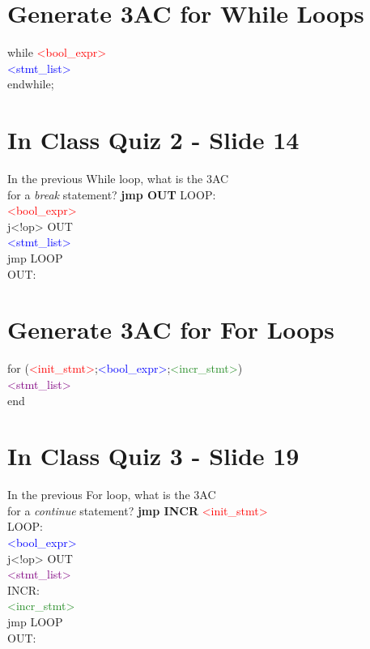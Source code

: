\documentclass{report}
\newcommand{\textb}[1]{\textcolor{blue}{#1}}
\newcommand{\textg}[1]{\textcolor{ForestGreen}{#1}}
\newcommand{\textp}[1]{\textcolor{purple}{#1}}
\newcommand{\textr}[1]{\textcolor{red}{#1}}
\newlength\tindent
\renewcommand{\indent}{\hspace*{\tindent}}
\begin{document}
\section{Generate 3AC for While Loops}
\vspace{-1em}
\begin{multicols}{2}
while \textr{<bool\_expr>} \\
\indent \textb{<stmt\_list>} \\
endwhile;
\section{In Class Quiz 2 - Slide 14}
\vspace{1em}
In the previous While loop, what is the 3AC \\ 
for a \textit{break} statement? \textbf{jmp OUT}
  \vfill\columnbreak
LOOP: \\
\indent \textr{<bool\_expr>} \\
\indent j<!op> OUT \\
\indent \textb{<stmt\_list>} \\
\indent jmp LOOP \\
OUT:
\end{multicols}

\section{Generate 3AC for For Loops}
\vspace{-1em}
\begin{multicols}{2}
for (\textr{<init\_stmt>};\textb{<bool\_expr>};\textg{<incr\_stmt>}) \\
\indent \textp{<stmt\_list>} \\
end
\section{In Class Quiz 3 - Slide 19}
In the previous For loop, what is the 3AC \\
for a \textit{continue} statement?
\textbf{jmp INCR}
  \vfill\columnbreak
\indent \textr{<init\_stmt>} \\
LOOP: \\
\indent \textb{<bool\_expr>} \\
\indent j<!op> OUT \\
\indent \textp{<stmt\_list>} \\
INCR: \\
\indent \textg{<incr\_stmt>} \\
\indent jmp LOOP \\
OUT:
\end{multicols}
\end{document}
